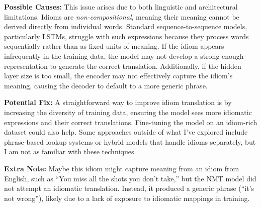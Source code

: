 \begin{parts}
\begin{subparts}
{            \textbf{Possible Causes:} This issue arises due to both linguistic and architectural limitations. Idioms
            are \textit{non-compositional}, meaning their meaning cannot be derived directly from individual words.
            Standard sequence-to-sequence models, particularly LSTMs, struggle with such expressions because they
            process words sequentially rather than as fixed units of meaning. If the idiom appears infrequently in
            the training data, the model may not develop a strong enough representation to generate the correct
            translation. Additionally, if the hidden layer size is too small, the encoder may not effectively capture
            the idiom's meaning, causing the decoder to default to a more generic phrase.

            \textbf{Potential Fix:} A straightforward way to improve idiom translation is by increasing the diversity
            of training data, ensuring the model sees more idiomatic expressions and their correct translations.
            Fine-tuning the model on an idiom-rich dataset could also help. Some approaches outside of what I've
            explored include phrase-based lookup systems or hybrid models that handle idioms separately, but I am not
            as familiar with these techniques.

            \textbf{Extra Note:} Maybe this idiom might capture meaning from an idiom from English, such as ``You miss all the shots you don't take,''
            but the NMT model did not attempt an idiomatic translation. Instead, it produced a generic phrase
            (``it's not wrong''), likely due to a lack of exposure to idiomatic mappings in training.
        }\fi
    \end{subparts}



\end{parts}
